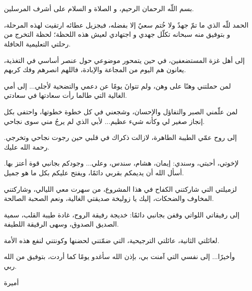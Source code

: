 \cleardoublepage
{}              %
\chapter*{\Huge\bfseries\hfill{}}
\thispagestyle{noheader}

\vspace{0.5cm}
\begin{RLtext}

بسم اللّه الرحمان الرحيم،  
و الصلاة و السلام على أشرف المرسلين.  

الحمد للّه الذي ما تمّ جهدٌ ولا خُتم سعيٌ إلا بفضله،  
فبجزيل عطائه ارتقيت لهذه المرحلة،  
و بتوفيق منه سبحانه تكلّل جهدي و اجتهادي لعيش هذه اللحظة؛  
لحظة التخرج من رحلتي التعليمية الحافلة.  

إلى أهل غزة المستضعفين،  
في حين يتمحور موضوعي حول عنصر أساسي في التغذية،  
يعانون هم اليوم من المجاعة والإبادة، فاللهم انصرهم وفك كربهم.  

لمن حملتني وهنًا على وهن،  
ولم تتوانَ يومًا عن دعمي والتضحية لأجلي...  
إلى أمي الغالية التي طالما رأت سعادتها في سعادتي.  

لمن علّمني الصبر والتفاؤل والإحسان،  
وشجعني في كل خطوة خطوتها،  
واحتفى بكل إنجاز صغير لي وكأنه شيء عظيم...  
لأبي الذي لم يرجُ مني سوى نجاحي.  

إلى روح عمّي الطيبة الطاهرة،  
لازالت ذكراك في قلبي حين رجوت نجاحي وتخرجي.  
رحمة الله عليك.  

لإخوتي، أحبتي، وسندي:  
إيمان، هشام، سندس، وعلي...  
وجودكم بجانبي قوة أعتز بها.  
أسأل الله أن يديمكم بقربي دائمًا، ويفتح عليكم بكل ما هو جميل.  

لزميلتي التي شاركتني الكفاح في هذا المشروع،  
من سهرت معي الليالي، وشاركتني المخاوف والضحكات،  
إليك يا زوليخة صديقتي الغالية، ونعم الصحبة الصالحة.  

إلى رفيقاتي اللواتي وقفن بجانبي دائمًا:  
خديجة رفيقة الروح، غادة طيبة القلب،  
سمية الصديق الصدوق، وسهى الرقيقة اللطيفة.  

لعائلتي الثانية، عائلتي الترجيحية،  
التي ضمّتني لحضنها وكونتني لنفع هذه الأمة.  

وأخيرًا... إلى نفسي التي آمنت بي،  
بإذن الله سأغدو يومًا كما أردت، بتوفيق من الله ربي.  

\hfill أميرة

\end{RLtext}

\pagebreak
